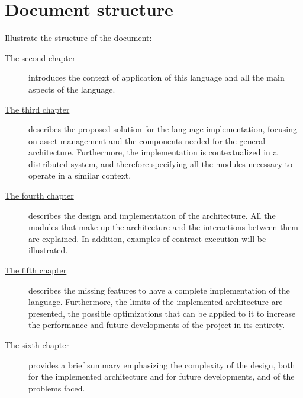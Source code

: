 \section{Document structure}

Illustrate the structure of the document:
\begin{description}
	\item[{\hyperref[cap:stipula]{The second chapter}}] introduces the context of application of this 
	language and all the main aspects of the language.
	
	\item[{\hyperref[cap:general-design]{The third chapter}}] describes the proposed solution for the 
	language implementation, focusing on asset management and the components needed for the general 
	architecture. Furthermore, the implementation is contextualized in a distributed system, and therefore 
	specifying all the modules necessary to operate in a similar context.
	
	\item[{\hyperref[cap:implementation]{The fourth chapter}}] describes the design and implementation of the 
	architecture. All the modules that make up the architecture and the interactions between them are 
	explained. In addition, examples of contract execution will be illustrated.
	
	\item[{\hyperref[cap:future-developments]{The fifth chapter}}] describes the missing features to have a 
	complete implementation of the language. Furthermore, the limits of the implemented architecture are 
	presented, the possible optimizations that can be applied to it to increase the performance and future 
	developments of the project in its entirety.
	
	\item[{\hyperref[cap:conclusions]{The sixth chapter}}] provides a brief summary emphasizing the 
	complexity of the design, both for the implemented architecture and for future developments, and of the 
	problems faced.
\end{description}
